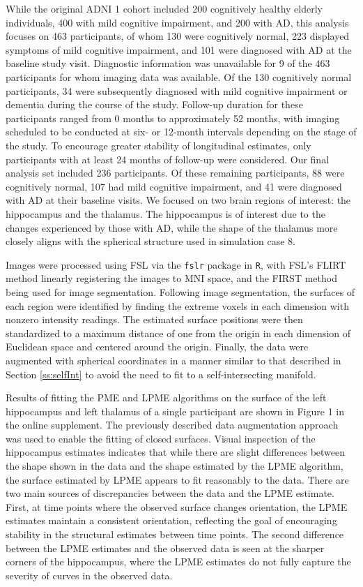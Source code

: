 \documentclass[12pt]{article}
\theoremstyle{definition}
\begin{document}
While the original ADNI 1 cohort included 200 cognitively healthy elderly individuals, 400 with mild cognitive impairment, and 200 with AD, this analysis focuses on 463 participants, of whom 130 were cognitively normal, 223 displayed symptoms of mild cognitive impairment, and 101 were diagnosed with AD at the baseline study visit. Diagnostic information was unavailable for 9 of the 463 participants for whom imaging data was available. Of the 130 cognitively normal participants, 34 were subsequently diagnosed with mild cognitive impairment or dementia during the course of the study. Follow-up duration for these participants ranged from 0 months to approximately 52 months, with imaging scheduled to be conducted at six- or 12-month intervals depending on the stage of the study. To encourage greater stability of longitudinal estimates, only participants with at least 24 months of follow-up were considered. Our final analysis set included 236 participants. Of these remaining participants, 88 were cognitively normal, 107 had mild cognitive impairment, and 41 were diagnosed with AD at their baseline visits. We focused on two brain regions of interest: the hippocampus and the thalamus. The hippocampus is of interest due to the changes experienced by those with AD, while the shape of the thalamus more closely aligns with the spherical structure used in simulation case 8.

Images were processed using FSL via the \texttt{fslr} package \citep{muschelliFslrConnectingFSL2015} in \texttt{R}, with FSL's FLIRT method linearly registering the images to MNI space, and the FIRST method being used for image segmentation. Following image segmentation, the surfaces of each region were identified by finding the extreme voxels in each dimension with nonzero intensity readings. The estimated surface positions were then standardized to a maximum distance of one from the origin in each dimension of Euclidean space and centered around the origin. Finally, the data were augmented with spherical coordinates in a manner similar to that described in Section \ref{ss:selfInt} to avoid the need to fit to a self-intersecting manifold.

Results of fitting the PME and LPME algorithms on the surface of the left hippocampus and left thalamus of a single participant are shown in Figure 1 in the online supplement. The previously described data augmentation approach was used to enable the fitting of closed surfaces. Visual inspection of the hippocampus estimates indicates that while there are slight differences between the shape shown in the data and the shape estimated by the LPME algorithm, the surface estimated by LPME appears to fit reasonably to the data. There are two main sources of discrepancies between the data and the LPME estimate. First, at time points where the observed surface changes orientation, the LPME estimates maintain a consistent orientation, reflecting the goal of encouraging stability in the structural estimates between time points. The second difference between the LPME estimates and the observed data is seen at the sharper corners of the hippocampus, where the LPME estimates do not fully capture the severity of curves in the observed data.
\end{document}
